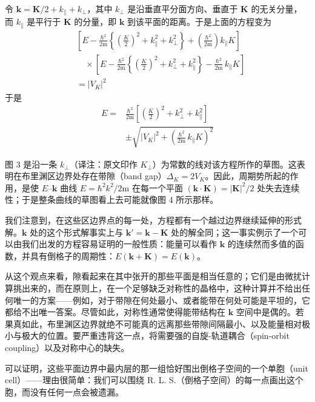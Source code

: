 令 $\mathbf{k} = \mathbf{K}/2 + k_{\parallel} + k_{\perp}$，其中 $k_{\perp}$ 是沿垂直平分面方向、垂直于 $\mathbf{K}$ 的无关分量，而 $k_{\parallel}$ 是平行于 $\mathbf{K}$ 的分量，即 $\mathbf{k}$ 到该平面的距离。于是上面的方程变为
\begin{align*}
&\left[E - \frac{\hbar^2}{2\mathrm{m}}\left\{\left(\frac{K}{2}\right)^{2} + k_{\parallel}^{2} + k_{\perp}^{2}\right\} + \left(\frac{\hbar^2}{2\mathrm{m}}\right)k_{\parallel}K\right] \\
&\quad\times\left[E - \frac{\hbar^2}{2\mathrm{m}}\left\{\left(\frac{K}{2}\right)^{2} + k_{\perp}^{2} + k_{\parallel}^{2}\right\} - \frac{\hbar^2}{2\mathrm{m}}\,k_{\parallel}K\right] \\
&= |V_K|^{2}
\end{align*}
于是
\begin{align*}
E = {}& \frac{\hbar^2}{2\mathrm{m}}\left[\left(\frac{K}{2}\right)^{2} + k_{\perp}^{2} + k_{\parallel}^{2}\right] \\
&\pm \sqrt{|V_K|^{2} + \left(\frac{\hbar^2}{2\mathrm{m}}\,k_{\parallel}K\right)^{2}}
\end{align*}

图 3 是沿一条 $k_{\perp}$（译注：原文印作 $K_{\perp}$）为常数的线对该方程所作的草图。这表明在布里渊区边界处存在带隙（band gap）$\Delta_K = 2V_K$。因此，周期势所起的作用，是使 $E$–$\mathbf{k}$ 曲线 $E = \hbar^2 k^2/2\mathrm{m}$ 在每一个平面 $(\mathbf{k}\cdot\mathbf{K}) = |\mathbf{K}|^2/2$ 处失去连续性；于是整条曲线的草图看上去可能就像图 4 所示那样。



我们注意到，在这些区边界点的每一处，方程都有一个越过边界继续延伸的形式解。$\mathbf{k}$ 处的这个形式解事实上与 $\mathbf{k}' = \mathbf{k} - \mathbf{K}$ 处的解全同；这一事实例示了一个可以由我们出发的方程容易证明的一般性质：能量可以看作 $\mathbf{k}$ 的连续然而多值的函数，并具有倒格子的周期性：$E(\mathbf{k}+\mathbf{K}) = E(\mathbf{k})$。

从这个观点来看，隙看起来在其中张开的那些平面是相当任意的；它们是由微扰计算挑出来的，而在原则上，在一个足够缺乏对称性的晶格中，这种计算并不给出任何唯一的方案——例如，对于带隙在何处最小、或者能带在何处可能是平坦的，它都给不出唯一答案。尽管如此，对称性通常使得能带结构在 $\mathbf{k}$ 空间中是偶的。若果真如此，布里渊区边界就绝不可能真的远离那些带隙间隔最小、以及能量相对极小与极大的位置。要严重违背这一点，将需要强的自旋-轨道耦合（spin-orbit coupling）以及对称中心的缺失。

可以证明，这些平面边界中最内层的那一组恰好围出倒格子空间的一个单胞（unit cell）——理由很简单：我们可以围绕 R. L. S.（倒格子空间）的每一点画出这个胞，而没有任何一点会被遗漏。

